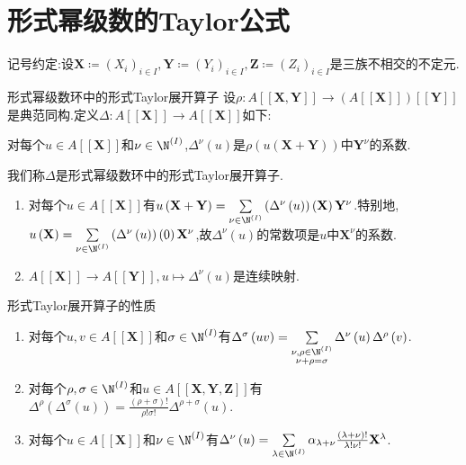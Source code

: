 \section{形式幂级数的Taylor公式}

记号约定:设$\mathbf{X}\coloneq(X_{i})_{i\in I},\mathbf{Y}\coloneq\left(Y_{i}\right)_{i\in I},\mathbf{Z}\coloneq\left(Z_{i}\right)_{i\in I}$是三族不相交的不定元.

\begin{definition}{形式幂级数环中的形式Taylor展开算子}{}
	设$\rho:A[[\mathbf{X},\mathbf{Y}]]\to(A[[\mathbf{X}]])[[\mathbf{Y}]]$是典范同构.定义$\Delta:A[[\mathbf{X}]]\to A[[\mathbf{X}]]$如下:
	\begin{center}
		对每个$u\in A[[\mathbf{X}]]$和$\nu\in\N^{\left(I\right)}$,$\Delta^{\nu}\left(u\right)$是$\rho\left(u\left(\mathbf{X}+\mathbf{Y}\right)\right)$中$\mathbf{Y}^{\nu}$的系数.
	\end{center}
	我们称$\Delta$是形式幂级数环中的形式Taylor展开算子.
\end{definition}

\begin{remark}{}{}
	\begin{enumerate}
		\item 对每个$u\in A[[\mathbf{X}]]$有$u\left(\mathbf{X}+\mathbf{Y}\right)=\sum\limits_{\nu\in\N^{\left(I\right)}}\left(\Delta^{\nu}\left(u\right)\right)\left(\mathbf{X}\right)\mathbf{Y}^{\nu}$.特别地,$u\left(\mathbf{X}\right)=\sum\limits_{\nu\in\N^{\left(I\right)}}\left(\Delta^{\nu}\left(u\right)\right)\left(0\right)\mathbf{X}^{\nu}$,故$\Delta^{\nu}\left(u\right)$的常数项是$u$中$\mathbf{X}^{\nu}$的系数.
		\item $A[[\mathbf{X}]]\to A[[\mathbf{Y}]],u\mapsto\Delta^{\nu}\left(u\right)$是连续映射.
	\end{enumerate}
\end{remark}

\begin{proposition}{形式Taylor展开算子的性质}{}
	\begin{enumerate}
		\item 对每个$u,v\in A[[\mathbf{X}]]$和$\sigma\in\N^{\left(I\right)}$有$\Delta^{\sigma}\left(uv\right)=\sum\limits_{\substack{\nu,\rho\in\N^{\left(I\right)}\\ \nu+\rho=\sigma}}\Delta^{\nu}\left(u\right)\Delta^{\rho}\left(v\right)$.
		\item 对每个$\rho,\sigma\in\N^{\left(I\right)}$和$u\in A[[\mathbf{X},\mathbf{Y},\mathbf{Z}]]$有$\Delta^{\rho}\left(\Delta^{\sigma}\left(u\right)\right)=\frac{\left(\rho+\sigma\right)!}{\rho!\sigma!}\Delta^{\rho+\sigma}\left(u\right)$.
		\item 对每个$u\in A[[\mathbf{X}]]$和$\nu\in\N^{\left(I\right)}$有$\Delta^{\nu}\left(u\right)=\sum\limits_{\lambda\in\N^{\left(I\right)}}\alpha_{\lambda+\nu}\frac{\left(\lambda+\nu\right)!}{\lambda!\nu!}\mathbf{X}^{\lambda}$.
	\end{enumerate}
\end{proposition}

